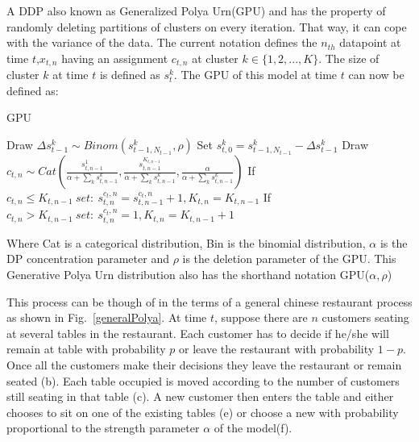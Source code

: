 \documentclass[]{article}
\begin{document}
A DDP also known as Generalized Polya Urn(GPU)\cite{caron} and has the property of randomly deleting partitions of clusters on every iteration. That way, it can cope with the variance of the data. The current notation defines the $n_{th}$ datapoint at time $t$,$x_{t,n}$ having an assignment $c_{t,n}$ at cluster $k \in \{1,2,..., K\} $. The size of cluster $k$ at time $t$ is defined as $s_t^k$. The GPU of this model at time $t$ can now be defined as:

\begin{algorithm}
    \caption{GPU}\label{GPU}
    \begin{algorithmic}[1]

        \State Draw $\Delta s_{t-1}^k \sim Binom(s_{t-1,N_{t-1}}^k, \rho) $ 
        \State Set $s_{t,0}^{k} = s_{t-1,N_{t-1}}^{k} -\Delta s_{t-1}^k$
        \EndFor
        \State Draw $c_{t,n} \sim Cat( \frac{ s_{t,n-1}^{1} }{\alpha + \sum_k s_{t,n-1}^{k} }, \frac{ s_{t,n-1}^{K_{t,n-1}} }{\alpha + \sum_k s_{t,n-1}^{k} } , \frac{ \alpha}{\alpha + \sum_k s_{t,n-1}^{k} }) $
        \State If $c_{t,n} \leq K_{t,n-1}\ set:\ s_{t,n}^{c_t,n} = s_{t,n-1}^{c_t,n} + 1 , K_{t,n} = K_{t,n-1}$
        \State If $c_{t,n} > K_{t,n-1}\ set:\ s_{t,n}^{c_t,n} = 1 , K_{t,n} = K_{t,n-1} + 1$
        \EndFor
        \EndProcedure
    \end{algorithmic}
\end{algorithm}

Where Cat is a categorical distribution, Bin is the binomial distribution, $\alpha$ is the DP concentration parameter and $\rho$ is the deletion parameter of the GPU. This Generative Polya Urn distribution also has the shorthand notation GPU($\alpha,\rho$)

This process can be though of in the terms of a general chinese restaurant process\cite{antoniak} as shown in Fig.~\ref{generalPolya}. At time $t$, suppose there are $n$ customers seating at several tables in the restaurant. Each customer has to decide if he/she will remain at table with probability $p$ or leave the restaurant with probability $1-p$. Once all the customers make their decisions they leave the restaurant or remain seated (b). Each table occupied is moved according to the number of customers still seating in that table (c). A new customer then enters the table and either chooses to sit on one of the existing tables (e) or choose a new with probability proportional to the strength parameter $\alpha$ of the model(f).
\end{document}
